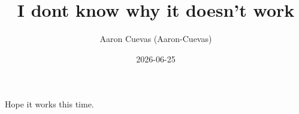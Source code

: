 \documentclass[11pt]{article}
\title{I dont know why it doesn't work}
\author{Aaron Cuevas (Aaron-Cuevas)}
\date{2026-06-25}
\begin{document}
\maketitle
Hope it works this time.
%
%
\end{document}

